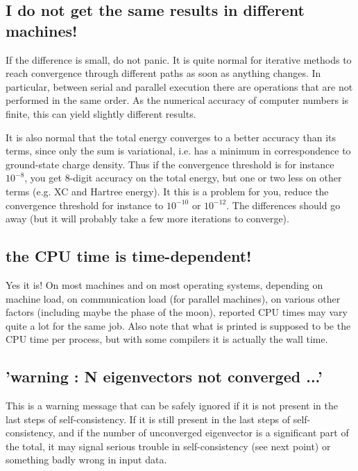 \documentclass[12pt,a4paper]{article}
\begin{document}
\subsection{I do not get the same results in different machines!}
If the difference is small, do not panic. It is quite normal for
iterative methods to reach convergence through different paths as soon
as anything changes. In particular, between serial and parallel
execution there are operations that are not performed in the same
order. As the numerical accuracy of computer numbers is finite, this
can yield slightly different results. 

It is also normal that the total energy converges to a better accuracy
than its terms, since only the sum is variational, i.e. has a minimum
in correspondence to ground-state charge density. Thus if the
convergence threshold is for instance $10^{-8}$, you get 8-digit
accuracy on the total energy, but one or two less on other terms
(e.g. XC and Hartree energy). It this is a problem for you, reduce the
convergence threshold for instance to  $10^{-10}$ or  $10^{-12}$. The
differences should go away (but it will probably take a few more
iterations to converge). 

\subsection{the CPU time is time-dependent!}
Yes it is! On most machines and on
most operating systems, depending on machine load, on communication load
(for parallel machines), on various other factors (including maybe the phase
of the moon), reported CPU times may vary quite a lot for the same job.
Also note that what is printed is supposed to be the CPU time per process,
but with some compilers it is actually the wall time.

\subsection{'warning : N eigenvectors not converged ...'}
This is a warning message that can be safely ignored if it is not
present in the last steps of self-consistency. If it is still present
in the last steps of self-consistency, and if the number of
unconverged eigenvector is a significant part of the total, it may
signal serious trouble in self-consistency (see next point) or
something badly wrong in input data.
\end{document}

